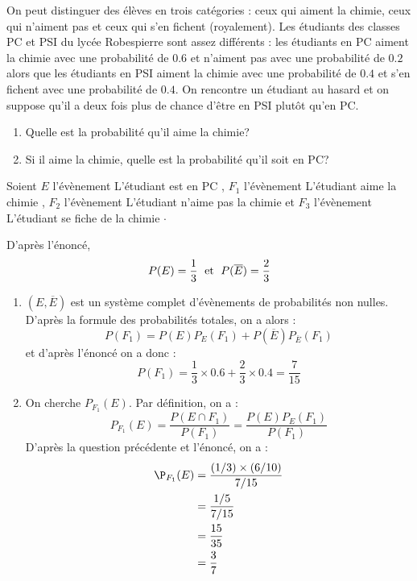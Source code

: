 \documentclass[a4paper,10pt]{report}
\begin{document}
\begin{Exercice}{} On peut distinguer des élèves en trois catégories : ceux qui aiment la chimie, ceux qui n'aiment pas et ceux qui s'en fichent (royalement). Les étudiants des classes PC et PSI du lycée Robespierre sont assez différents : les étudiants en PC aiment la chimie avec une probabilité de $0.6$ et n'aiment pas avec une probabilité de $0.2$ alors que les étudiants en PSI aiment la chimie avec une probabilité de $0.4$ et s'en fichent avec une probabilité de $0.4$. On rencontre un étudiant au hasard et on suppose qu'il a deux fois plus de chance d'être en PSI plutôt qu'en PC.

\begin{enumerate}
\item Quelle est la probabilité qu'il aime la chimie?
\item Si il aime la chimie, quelle est la probabilité qu'il soit en PC?
\end{enumerate}
\end{Exercice}

\corr Soient $E$ l'évènement \og L'étudiant est en PC \fg , $F_1$ l'évènement \og L'étudiant aime la chimie \fg , $F_2$ l'évènement \og L'étudiant n'aime pas la chimie \fg et $F_3$ l'évènement \og L'étudiant se fiche de la chimie \fg $\cdot$

\medskip

\noindent D'après l'énoncé,
$$ P(E) = \dfrac{1}{3} \; \hbox{ et } \; P(\overline{E}) = \dfrac{2}{3}$$
\begin{enumerate}
\item $(E, \overline{E})$ est un système complet d'évènements de probabilités non nulles. D'après la formule des probabilités totales, on a alors :
\[ P(F_1) = P(E) P_E(F_1) + P(\overline{E})P_{\overline{E}}(F_1) \]
et d'après l'énoncé on a donc :
\[ P(F_1) = \dfrac{1}{3} \times 0.6 + \dfrac{2}{3} \times 0.4 = \dfrac{7}{15} \]
\item On cherche $P_{F_1}(E)$. Par définition, on a :
\[ P_{F_1}(E) = \frac{P(E \cap F_1)}{P(F_1)} = \frac{P(E) P_E(F_1)}{P(F_1)} \]
D'après la question précédente et l'énoncé, on a :
\begin{align*}
\P_{F_1}(E) & = \frac{(1/3) \times (6/10)}{7/15} \\
& = \dfrac{1/5}{7/15} \\
& = \dfrac{15}{35} \\
& = \dfrac{3}{7}
\end{align*}
\end{enumerate}
\end{document}
